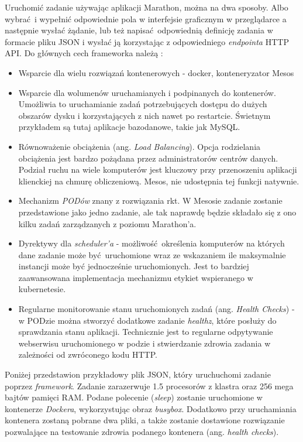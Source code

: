 \documentclass[10pt,a4paper,titlepage,twoside]{report}
\begin{document}
Uruchomić zadanie używając aplikacji Marathon, można na dwa sposoby. Albo wybrać i wypełnić odpowiednie pola w interfejsie graficznym w przeglądarce a następnie wysłać żądanie, lub też napisać odpowiednią definicję zadania w formacie pliku JSON i wysłać ją korzystając z odpowiedniego \textit{endpointa} HTTP API.
Do głównych cech frameworka należą \cite{ad41}:
\begin{itemize}
\item Wsparcie dla wielu rozwiązań kontenerowych - docker, konteneryzator Mesos
\item Wsparcie dla wolumenów uruchamianych i podpinanych do kontenerów. Umożliwia to uruchamianie zadań potrzebujących dostępu do dużych obszarów dysku i korzystających z nich nawet po restartcie. Świetnym przykładem są tutaj aplikacje bazodanowe, takie jak MySQL.
\item Równoważenie obciążenia (ang. \textit{Load Balancing}). Opcja rodzielania obciążenia jest bardzo pożądana przez administratorów centrów danych. Podział ruchu na wiele komputerów jest kluczowy przy przenoszeniu aplikacji klienckiej na chmurę obliczeniową. Mesos, nie udostępnia tej funkcji natywnie.
\item Mechanizm \textit{PODów} znany z rozwiązania rkt. W Mesosie zadanie zostanie przedstawione jako jedno zadanie, ale tak naprawdę będzie składało się z ono kilku zadań zarządzanych z poziomu Marathon'a.
\item Dyrektywy dla \textit{scheduler'a} - możliwość określenia komputerów na których dane zadanie może być uruchomione wraz ze wskazaniem ile maksymalnie instancji może być jednocześnie uruchomionych. Jest to bardziej zaawansowana implementacja mechanizmu etykiet wspieranego w kubernetesie.
\item Regularne monitorowanie stanu uruchomionych zadań (ang. \textit{Health Checks}) - w PODzie można stworzyć dodatkowe zadanie \textit{healthz}, które posłuży do sprawdzania stanu aplikacji. Technicznie jest to regularne odpytywanie webserwisu uruchomionego w podzie i stwierdzanie zdrowia zadania w zależności od zwróconego kodu HTTP.
\end{itemize}

Poniżej przedstawion przykładowy plik JSON, który uruchuchomi zadanie poprzez \textit{framework}. Zadanie zarazerwuje 1.5 procesorów z klastra oraz 256 mega bajtów pamięci RAM. Podane polecenie (\textit{sleep}) zostanie uruchomione w kontenerze \textit{Dockera}, wykorzystując obraz \textit{busybox}. Dodatkowo przy uruchamiania kontenera zostaną pobrane dwa pliki, a także zostanie dostawione rozwiązanie pozwalające na testowanie zdrowia podanego kontenera (ang. \textit{health checks}). 
\end{document}
